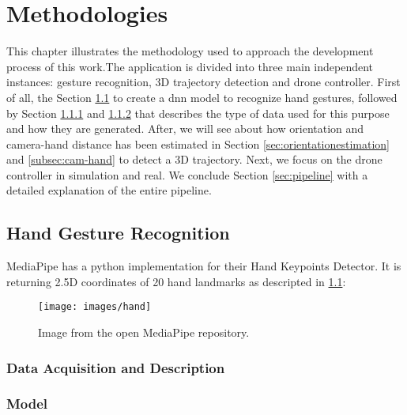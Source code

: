 \chapter{Methodologies}
\label{chap:methods}

This chapter illustrates the methodology used to approach the development process of this work.The application is divided into three main independent instances: gesture recognition, 3D trajectory detection and drone controller. First of all, the Section \ref{sec:handgestrec} to create a \gls{dnn} model to recognize hand gestures, followed by Section \ref{sec:getdata} and \ref{sec:model} that describes the type of data used for this purpose and how they are generated. After, we will see about how orientation and camera-hand distance has been estimated in Section \ref{sec:orientationestimation} and \ref{subsec:cam-hand} to detect a 3D trajectory. Next, we focus on the drone controller in simulation and real. We conclude Section \ref{sec:pipeline} with a detailed explanation of the entire pipeline.


\section{Hand Gesture Recognition}
\label{sec:handgestrec}
MediaPipe has a python implementation for their Hand Keypoints Detector. It is returning 2.5D coordinates of 20 hand landmarks as descripted in \ref{fig:handland}:


\begin{figure}[H]
	\centering
	\texttt{[image: images/hand]}
	\caption[Hand Landmarks.]{Image from the open MediaPipe repository.}
	\label{fig:handland}
\end{figure}



\subsection{Data Acquisition and Description}
\label{sec:getdata}

\subsection{Model}
\label{sec:model}

